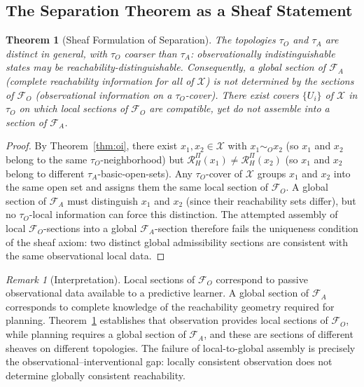 \documentclass[10pt,twocolumn]{article}
\theoremstyle{plain}
\newtheorem{theorem}{Theorem}
\theoremstyle{definition}
\theoremstyle{remark}
\newtheorem{remark}{Remark}
\newcommand{\simO}{\sim_{\!O}}
\newcommand{\RHP}{\mathcal{R}_{H}^{\Pi}}
\newcommand{\calX}{\mathcal{X}}
\begin{document}
\subsection*{The Separation Theorem as a Sheaf Statement}

\begin{theorem}[Sheaf Formulation of Separation]
\label{thm:sheaf_sep}
The topologies $\tau_O$ and $\tau_A$ are distinct in general, with $\tau_O$ coarser
than $\tau_A$: observationally indistinguishable states may be reachability-distinguishable.
Consequently, a global section of $\mathcal{F}_A$ (complete reachability
information for all of $\calX$) is not determined by the sections of $\mathcal{F}_O$
(observational information on a $\tau_O$-cover). There exist covers $\{U_i\}$
of $\calX$ in $\tau_O$ on which local sections of $\mathcal{F}_O$ are compatible,
yet do not assemble into a section of $\mathcal{F}_A$.
\end{theorem}

\begin{proof}
By Theorem~\ref{thm:oi}, there exist $x_1,x_2\in\calX$ with $x_1\simO x_2$
(so $x_1$ and $x_2$ belong to the same $\tau_O$-neighborhood) but
$\RHP(x_1)\neq\RHP(x_2)$ (so $x_1$ and $x_2$ belong to different
$\tau_A$-basic-open-sets). Any $\tau_O$-cover of $\calX$ groups $x_1$ and $x_2$
into the same open set and assigns them the same local section of
$\mathcal{F}_O$. A global section of $\mathcal{F}_A$ must distinguish $x_1$
and $x_2$ (since their reachability sets differ), but no $\tau_O$-local
information can force this distinction. The attempted assembly of local
$\mathcal{F}_O$-sections into a global $\mathcal{F}_A$-section therefore
fails the uniqueness condition of the sheaf axiom: two distinct global
admissibility sections are consistent with the same observational local data.
\end{proof}

\begin{remark}[Interpretation]
Local sections of $\mathcal{F}_O$ correspond to passive observational data
available to a predictive learner. A global section of $\mathcal{F}_A$
corresponds to complete knowledge of the reachability geometry required for
planning. Theorem~\ref{thm:sheaf_sep} establishes that observation provides
local sections of $\mathcal{F}_O$, while planning requires a global section of
$\mathcal{F}_A$, and these are sections of different sheaves on different
topologies. The failure of local-to-global assembly is precisely the
observational--interventional gap: locally consistent observation does not
determine globally consistent reachability.
\end{remark}
\end{document}
